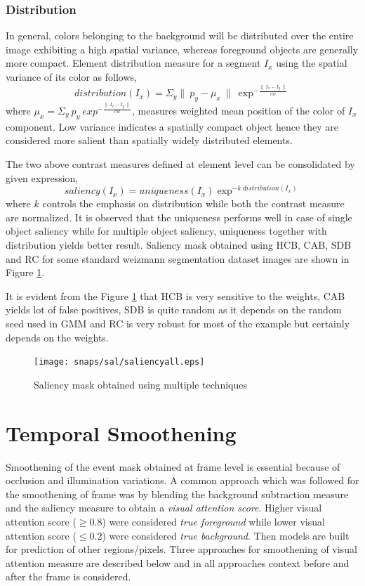 \subsubsection{Distribution}
In general, colors belonging to the background will be distributed over the entire image exhibiting a high spatial variance, whereas foreground objects are generally more compact.  Element distribution measure for a segment $I_{x}$ using the spatial variance of its color as follows,
$$distribution(I_{x}) = \Sigma_{y} \parallel~p_{y} -\mu_{x}~\parallel~\exp^{-\frac{\parallel~I_{x} - I_{y}~\parallel}{cw}}$$ 
where $\mu_{x} = \Sigma_{y}~p_{y}~exp^{-\frac{\parallel~I_{x} - I_{y}~\parallel}{cw}}$, measures weighted mean position of the color of $I_{x}$ component.  Low variance indicates a spatially compact object hence they are considered more salient than spatially widely distributed elements.

\par The two above contrast measures defined at element level can be consolidated by given expression,
$$saliency(I_{x}) = uniqueness(I_{x}) \exp^{-k~distribution(I_{x})}$$
where $k$ controls the emphasis on distribution while both the contrast measure are normalized. It is observed that the uniqueness performs well in case of single object saliency while for multiple object saliency, uniqueness together with distribution yields better result.  Saliency mask obtained using HCB, CAB, SDB and RC for some standard weizmann segmentation dataset images are shown in Figure \ref{fig:sal}.
\par It is evident from the Figure \ref{fig:sal} that HCB is very sensitive to the weights, CAB yields lot of false positives, SDB is quite random as it depends on the random seed used in GMM and RC is very robust for most of the example but certainly depends on the weights.

\begin{figure}[htpb]
   \begin{center}
	    \texttt{[image: snaps/sal/saliencyall.eps]}     
     \caption {Saliency mask obtained using multiple techniques}
   \label{fig:sal}
   \end{center}
 \end{figure}
 \section{Temporal Smoothening}
  \label{sec:ts}
Smoothening of the event mask obtained at frame level is essential because of occlusion and illumination variations.  A common approach which was followed for the smoothening of frame was by blending the background subtraction measure and the saliency measure to obtain a \textit{visual attention score}. Higher visual attention score ($\geqslant0.8$) were considered \textit{true foreground} while lower visual attention score ($\leqslant0.2$)  were considered \textit{true background}.  Then models are built for prediction of other regions/pixels.  Three approaches for smoothening of visual attention measure are described below and in all approaches context before and after the frame is considered.

